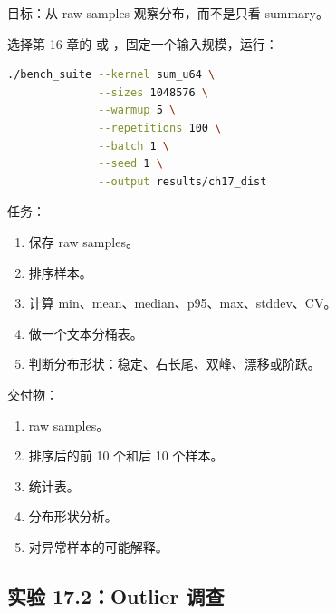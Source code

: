 \begin{labbox}
目标：从 raw samples 观察分布，而不是只看 summary。

选择第 16 章的  或 ，固定一个输入规模，运行：

\begin{lstlisting}[language=bash]
./bench_suite --kernel sum_u64 \
              --sizes 1048576 \
              --warmup 5 \
              --repetitions 100 \
              --batch 1 \
              --seed 1 \
              --output results/ch17_dist
\end{lstlisting}

任务：

\begin{enumerate}
  \item 保存 raw samples。
  \item 排序样本。
  \item 计算 min、mean、median、p95、max、stddev、CV。
  \item 做一个文本分桶表。
  \item 判断分布形状：稳定、右长尾、双峰、漂移或阶跃。
\end{enumerate}

交付物：

\begin{enumerate}
  \item raw samples。
  \item 排序后的前 10 个和后 10 个样本。
  \item 统计表。
  \item 分布形状分析。
  \item 对异常样本的可能解释。
\end{enumerate}
\end{labbox}

\subsection{实验 17.2：Outlier 调查}


